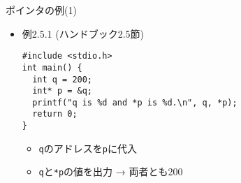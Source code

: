 \begin{frame}[t,fragile]{ポインタの例(1)}
  \begin{itemize}
  \item 例2.5.1 (ハンドブック2.5節)
\begin{lstlisting}
#include <stdio.h>
int main() {
  int q = 200;
  int* p = &q;
  printf("q is %d and *p is %d.\n", q, *p);
  return 0;
}
\end{lstlisting}
\begin{itemize}
\item \verb+q+のアドレスを\verb+p+に代入
\item \verb+q+と\verb+*p+の値を出力 → 両者とも200
\end{itemize}
  \end{itemize}
\end{frame}
